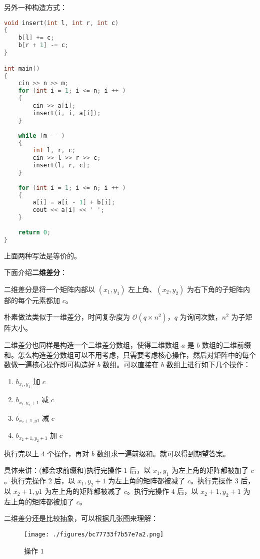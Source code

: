 另外一种构造方式：

\begin{lstlisting}[language=cpp]
void insert(int l, int r, int c)
{
    b[l] += c;
    b[r + 1] -= c;
}

int main()
{
    cin >> n >> m;
    for (int i = 1; i <= n; i ++ ) 
    {
        cin >> a[i];
        insert(i, i, a[i]);
    }
    
    while (m -- )
    {
        int l, r, c;
        cin >> l >> r >> c;
        insert(l, r, c);
    }
    
    for (int i = 1; i <= n; i ++ ) 
    {
        a[i] = a[i - 1] + b[i];
        cout << a[i] << ' ';
    }
    
    return 0;
}
\end{lstlisting}

上面两种写法是等价的。

下面介绍\textbf{二维差分}：

二维差分是将一个矩阵内部以 $(x_1, y_1)$ 左上角、$(x_2, y_2)$ 为右下角的子矩阵内部的每个元素都加 $c$。

朴素做法类似于一维差分，时间复杂度为 $\mathcal{O}(q \times n^2)$，$q$ 为询问次数，$n^2$ 为子矩阵大小。

二维差分也同样是构造一个二维差分数组，使得二维数组 $a$ 是 $b$ 数组的二维前缀和。怎么构造差分数组可以不用考虑，只需要考虑核心操作，然后对矩阵中的每个数做一遍核心操作即可构造好 $b$ 数组。可以直接在 $b$ 数组上进行如下几个操作：

\begin{enumerate}
\item $b_{x_1, y_1}$ 加 $c$
\item $b_{x_1, y_2 + 1}$ 减 $c$ 
\item $b_{x_2 + 1, y1}$ 减 $c$
\item $b_{x_2 + 1, y_2 + 1}$ 加 $c$
\end{enumerate}

执行完以上 $4$ 个操作，再对 $b$ 数组求一遍前缀和。就可以得到期望答案。 

具体来讲：(都会求前缀和)执行完操作 $1$ 后，以 $x_1, y_1$ 为左上角的矩阵都被加了 $c$。执行完操作 $2$ 后，以 $x_1, y_2 + 1$ 为左上角的矩阵都被减了 $c$。执行完操作 $3$ 后，以 $x_2 + 1, y1$ 为左上角的矩阵都被减了 $c$。执行完操作 $4$ 后，以 $x_2 + 1, y_2 + 1$ 为左上角的矩阵都被加了 $c$。

二维差分还是比较抽象，可以根据几张图来理解：

\begin{figure}[ht]
\centering
\texttt{[image: ./figures/bc77733f7b57e7a2.png]}
\caption{操作 $1$} \label{fig_AD_1}
\end{figure}


